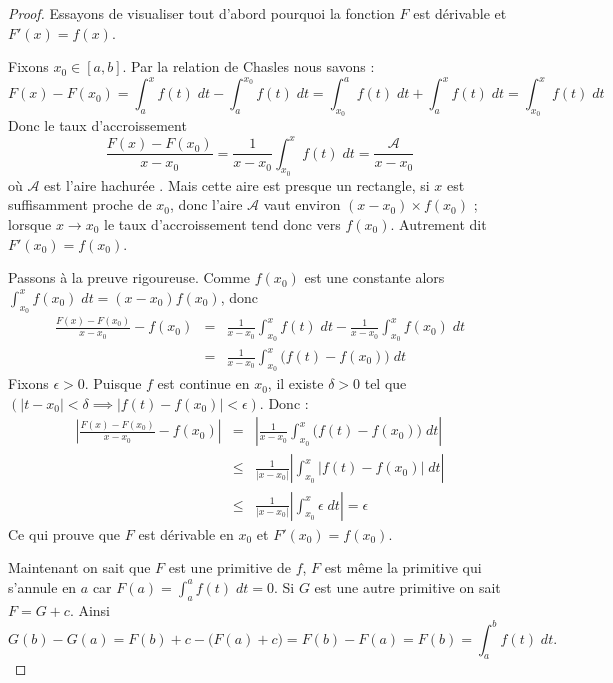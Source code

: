 \documentclass[class=report,crop=false]{standalone}
\begin{document}
\begin{proof}
Essayons de visualiser tout d'abord pourquoi la fonction $F$ est dérivable et $F'(x)=f(x)$.



Fixons $x_0\in[a,b]$.
Par la relation de Chasles nous savons :
$$F(x)-F(x_0) = \int_a^x f(t) \; dt - \int_a^{x_0} f(t) \; dt =
\int_{x_0}^a f(t) \; dt + \int_a^x f(t) \; dt  = \int_{x_0}^x f(t) \; dt$$
Donc le taux d'accroissement
$$\frac{F(x)-F(x_0)}{x - x_0} = \frac{1}{x - x_0} \int_{x_0}^x f(t) \; dt = \frac{\mathcal{A}}{x - x_0} $$
où $\mathcal{A}$ est l'aire hachurée . Mais cette aire est presque un rectangle, si $x$ est suffisamment
proche de $x_0$, donc l'aire $\mathcal{A}$ vaut environ $(x - x_0)\times f(x_0)$ ; 
lorsque $x\to x_0$ le taux d'accroissement tend donc vers $f(x_0)$. Autrement dit $F'(x_0)=f(x_0)$.

\bigskip

Passons à la preuve rigoureuse.
Comme $f(x_0)$ est une constante alors $\int_{x_0}^x f(x_0) \; dt=(x - x_0)f(x_0)$, donc
\begin{eqnarray*}
\frac{F(x)-F(x_0)}{x - x_0} -f(x_0)
  &=& \frac{1}{x - x_0} \int_{x_0}^x f(t) \; dt - \frac{1}{x - x_0} \int_{x_0}^x f(x_0) \; dt \\
  &=& \frac{1}{x - x_0} \int_{x_0}^x \big(f(t)-f(x_0)\big) \; dt  
\end{eqnarray*}
Fixons $\epsilon >0$. Puisque $f$ est continue en $x_0$, il existe $\delta > 0$
tel que $(|t-x_0| < \delta \implies |f(t)-f(x_0)| < \epsilon)$.
Donc :
\begin{eqnarray*}
\left| \frac{F(x)-F(x_0)}{x - x_0} -f(x_0)\right|
  &=& \left| \frac{1}{x - x_0} \int_{x_0}^x \big(f(t)-f(x_0)\big) \; dt\right| \\
  &\le& \frac{1}{|x - x_0|}\left| \int_{x_0}^x \big| f(t)-f(x_0)\big| \; dt\right| \\
  &\le&  \frac{1}{|x - x_0|} \left|\int_{x_0}^x \epsilon \; dt \right|= \epsilon
\end{eqnarray*}
Ce qui prouve que $F$ est dérivable en $x_0$ et $F'(x_0)=f(x_0)$.

\bigskip

Maintenant on sait que $F$ est une primitive de $f$, $F$ est même la primitive qui s'annule en $a$ car
$F(a) =\int_a^a f(t) \; dt=0$.  Si $G$ est une autre primitive on sait $F=G+c$. Ainsi
\[
G(b)-G(a) = F(b)+c - \big( F(a)+c \big) = F(b)-F(a) = F(b) = \int_a^b f(t) \; dt .
\]
\end{proof}
\end{document}
